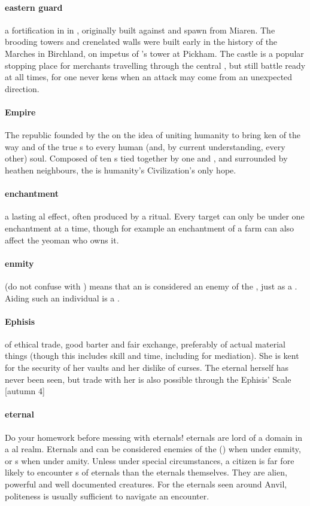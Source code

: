 \paragraph{eastern guard} a fortification in  in , originally built against  and spawn from Miaren. The brooding towers and crenelated walls were built early in the history of the Marches in Birchland, on impetus of 's tower at Pickham. The castle is a popular stopping place for merchants travelling through the central , but still battle ready at all times, for one never kens when an attack may come from an unexpected direction. 
\paragraph{Empire} The republic founded by the  on the idea of uniting humanity to bring ken of the way and of the true s to every human (and, by current understanding, every other) soul. Composed of ten s tied together by one  and , and surrounded by heathen neighbours, the  is humanity's Civilization's only hope.
\paragraph{enchantment} a lasting al effect, often produced by a ritual. Every target can only be under one enchantment at a time, though for example an enchantment of a farm can also affect the yeoman who owns it.
\paragraph{enmity} (do not confuse with ) means that an  is considered an enemy of the , just as a . Aiding such an individual is a .
\paragraph{Ephisis}   of ethical trade, good barter and fair exchange, preferably of actual material things (though this includes skill and time, including for mediation). She is kent for the security of her vaults and her dislike of curses. The eternal herself has never been seen, but trade with her is also possible through the  Ephisis' Scale [autumn  4]
\paragraph{eternal} Do your homework before messing with eternals! eternals are lord of a domain in a al realm. Eternals and can be considered enemies of the  () when under enmity, or s when under amity. Unless under special circumstances, a citizen is far fore likely to encounter s of eternals than the eternals themselves.  They are alien, powerful and well documented creatures. For the eternals seen around Anvil, politeness is usually sufficient to navigate an encounter.
